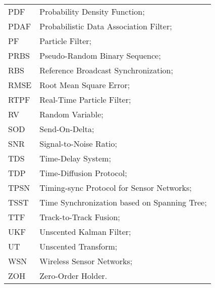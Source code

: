 \begin{longtable}{ll}
	PDF         & Probability Density Function; \\
	PDAF		& Probabilistic Data Association Filter; \\
	PF 			& Particle Filter; \\
	PRBS		& Pseudo-Random Binary Sequence; \\
	RBS			& Reference Broadcast Synchronization; \\
	RMSE		& Root Mean Square Error; \\
	RTPF		& Real-Time Particle Filter; \\
	RV			& Random Variable; \\
	SOD			& Send-On-Delta; \\
	SNR			& Signal-to-Noise Ratio; \\
	TDS			& Time-Delay System; \\
	TDP			& Time-Diffusion Protocol; \\
	TPSN		& Timing-sync Protocol for Sensor Networks; \\
	TSST		& Time Synchronization based on Spanning Tree; \\
	TTF 		& Track-to-Track Fusion; \\
	UKF			& Unscented Kalman Filter; \\
	UT			& Unscented Transform; \\
	WSN			& Wireless Sensor Networks; \\
	ZOH			& Zero-Order Holder. \\
\end{longtable}

